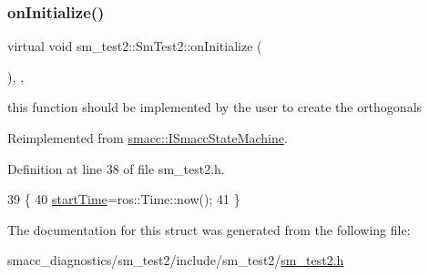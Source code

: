 \subsubsection{\texorpdfstring{on\+Initialize()}{onInitialize()}}
{\footnotesize\ttfamily virtual void sm\+\_\+test2\+::\+Sm\+Test2\+::on\+Initialize (\begin{DoxyParamCaption}{ }\end{DoxyParamCaption})\hspace{0.3cm}{\ttfamily [inline]}, {\ttfamily [override]}, {\ttfamily [virtual]}}



this function should be implemented by the user to create the orthogonals 



Reimplemented from \hyperlink{classsmacc_1_1ISmaccStateMachine_ac2982c6c8283663e5e1e8a7c82f511ec}{smacc\+::\+I\+Smacc\+State\+Machine}.



Definition at line 38 of file sm\+\_\+test2.\+h.


\begin{DoxyCode}
39     \{
40         \hyperlink{namespacesm__test2_a0b4e1ce52146b421cf6062a0900035aa}{startTime}=ros::Time::now();
41     \}
\end{DoxyCode}


The documentation for this struct was generated from the following file\+:\begin{DoxyCompactItemize}
\item 
smacc\+\_\+diagnostics/sm\+\_\+test2/include/sm\+\_\+test2/\hyperlink{sm__test2_8h}{sm\+\_\+test2.\+h}\end{DoxyCompactItemize}
